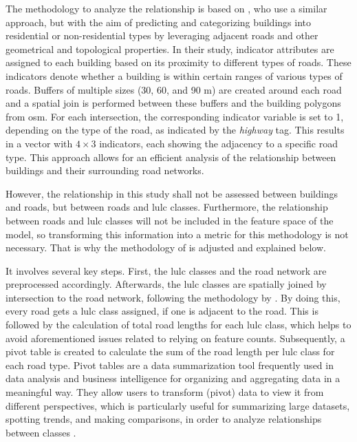 The methodology to analyze the relationship is based on \textcite{Atwal.Anderson.ea2022}, who use a similar approach, but with the aim of predicting and categorizing buildings into residential or non-residential types by leveraging adjacent roads and other geometrical and topological properties. In their study, indicator attributes are assigned to each building based on its proximity to different types of roads. These indicators denote whether a building is within certain ranges of various types of roads. Buffers of multiple sizes (30, 60, and 90 m) are created around each road and a spatial join is performed between these buffers and the building polygons from \gls{osm}. For each intersection, the corresponding indicator variable is set to 1, depending on the type of the road, as indicated by the \emph{highway} tag. This results in a vector with \( 4 \times 3 \) indicators, each showing the adjacency to a specific road type. This approach allows for an efficient analysis of the relationship between buildings and their surrounding road networks.

However, the relationship in this study shall not be assessed between buildings and roads, but between roads and \gls{lulc} classes. Furthermore, the relationship between roads and \gls{lulc} classes will not be included in the feature space of the model, so transforming this information into a metric for this methodology is not necessary. That is why the methodology of \textcite{Atwal.Anderson.ea2022} is adjusted and explained below. 

It involves several key steps. First, the \gls{lulc} classes and the road network are preprocessed accordingly. Afterwards, the \gls{lulc} classes are spatially joined by intersection to the road network, following the methodology by \textcite{Atwal.Anderson.ea2022}. By doing this, every road gets a \gls{lulc} class assigned, if one is adjacent to the road. This is followed by the calculation of total road lengths for each \gls{lulc} class, which helps to avoid aforementioned issues related to relying on feature counts. Subsequently, a pivot table is created to calculate the sum of the road length per \gls{lulc} class for each road type. Pivot tables are a data summarization tool frequently used in data analysis and business intelligence for organizing and aggregating data in a meaningful way. They allow users to transform (pivot) data to view it from different perspectives, which is particularly useful for summarizing large datasets, spotting trends, and making comparisons, in order to analyze relationships between classes \autocite{Alexander.Kusleika2022}.

